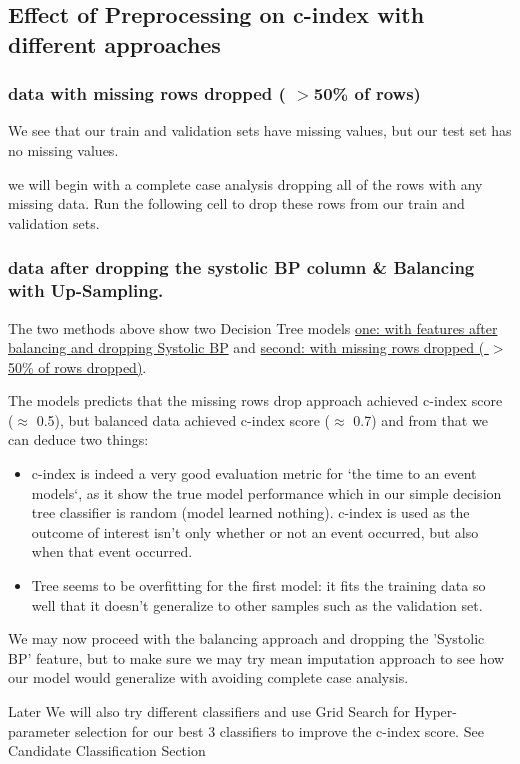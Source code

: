 \documentclass[5 pt]{article}
\begin{document}
\subsection{Effect of Preprocessing on c-index with different approaches}

\subsubsection{data with missing rows dropped ( \(>\)50\% of rows)}
We see that our train and validation sets have missing values, but our test set has no missing values.

we will begin with a  complete case analysis dropping all of the rows with any missing data. Run the following cell to drop these rows from our train and validation sets.

\subsubsection{data after dropping the systolic BP column \& Balancing with Up-Sampling.}
The two methods above show two Decision Tree models \underline{one: with features after balancing and dropping Systolic BP} and \underline{second: with missing rows dropped ( \(>\)50\% of rows dropped)}.

The models predicts that the missing rows drop approach achieved c-index score (\(\approx\) 0.5), but balanced data achieved c-index score (\(\approx\) 0.7) and from that we can deduce two things:
\begin{itemize}
    \item c-index is indeed a very good evaluation metric for `the time to an event models`, as it show the true model performance which in our simple decision tree classifier is random (model learned nothing). c-index is used as the outcome of interest isn't only whether or not an event occurred, but also when that event occurred. 
    \item Tree seems to be overfitting for the first model: it fits the training data so well that it doesn't generalize to other samples such as the validation set.
\end{itemize}


We may now proceed with the balancing approach and dropping the 'Systolic BP' feature, but to make sure we may try mean imputation approach to see how our model would generalize with avoiding complete case analysis.

Later We will also try different classifiers and use Grid Search for Hyper-parameter selection for our best 3 classifiers to improve the c-index score. See Candidate Classification Section
\end{document}

